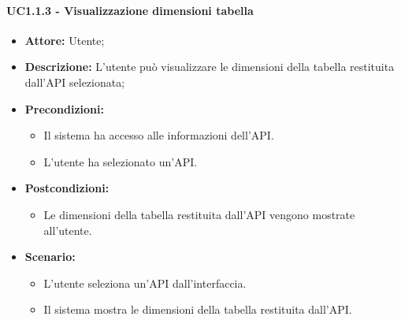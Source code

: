 \paragraph{UC1.1.3 - Visualizzazione dimensioni tabella}
\begin{itemize}
    \item \textbf{Attore:} Utente;
    \item \textbf{Descrizione:} L'utente può visualizzare le dimensioni della tabella restituita dall'API selezionata;
    \item \textbf{Precondizioni:}
    \begin{itemize}
        \item Il sistema ha accesso alle informazioni dell'API.
        \item L'utente ha selezionato un'API.
    \end{itemize}
    \item \textbf{Postcondizioni:}
    \begin{itemize}
        \item Le dimensioni della tabella restituita dall'API vengono mostrate all'utente.
    \end{itemize}
    \item \textbf{Scenario:}
    \begin{itemize}
        \item L'utente seleziona un'API dall'interfaccia.
        \item Il sistema mostra le dimensioni della tabella restituita dall'API.
    \end{itemize}
\end{itemize}

